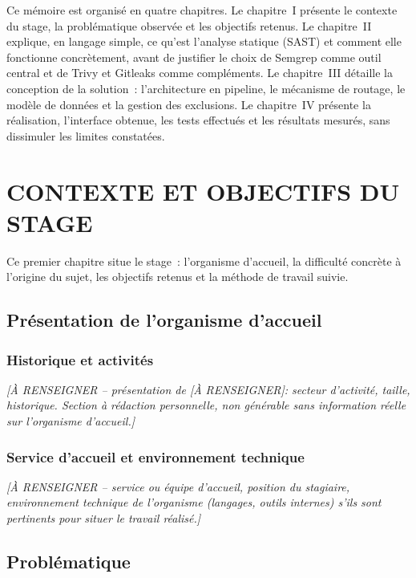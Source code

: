 \documentclass[12pt,a4paper,oneside]{report}
\newcommand{\HostOrg}{[\`A RENSEIGNER]}
\begin{document}
Ce m\'emoire est organis\'e en quatre chapitres. Le chapitre~I pr\'esente le contexte du stage, la probl\'ematique observ\'ee et les objectifs retenus. Le chapitre~II explique, en langage simple, ce qu'est l'analyse statique (SAST) et comment elle fonctionne concr\`etement, avant de justifier le choix de Semgrep comme outil central et de Trivy et Gitleaks comme compl\'ements. Le chapitre~III d\'etaille la conception de la solution~: l'architecture en pipeline, le m\'ecanisme de routage, le mod\`ele de donn\'ees et la gestion des exclusions. Le chapitre~IV pr\'esente la r\'ealisation, l'interface obtenue, les tests effectu\'es et les r\'esultats mesur\'es, sans dissimuler les limites constat\'ees.


\chapter{CONTEXTE ET OBJECTIFS DU STAGE}

Ce premier chapitre situe le stage~: l'organisme d'accueil, la difficult\'e concr\`ete \`a l'origine du sujet, les objectifs retenus et la m\'ethode de travail suivie.

\section{Pr\'esentation de l'organisme d'accueil}

\subsection{Historique et activit\'es}
\textit{[\`A RENSEIGNER -- pr\'esentation de \HostOrg : secteur d'activit\'e, taille, historique. Section \`a r\'edaction personnelle, non g\'en\'erable sans information r\'eelle sur l'organisme d'accueil.]}

\subsection{Service d'accueil et environnement technique}
\textit{[\`A RENSEIGNER -- service ou \'equipe d'accueil, position du stagiaire, environnement technique de l'organisme (langages, outils internes) s'ils sont pertinents pour situer le travail r\'ealis\'e.]}

\section{Probl\'ematique}
\end{document}
